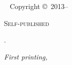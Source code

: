 \newpage
\begin{fullwidth}
~\vfill
\thispagestyle{empty}
\setlength{\parindent}{0pt}
\setlength{\parskip}{\baselineskip}
Copyright \copyright\ 2013--\the\year\ \thanklessauthor

\par\textsc{Self-published}

\par\bookurl

\par \TODO.

\par\textit{First printing, \monthyear}
\end{fullwidth}
